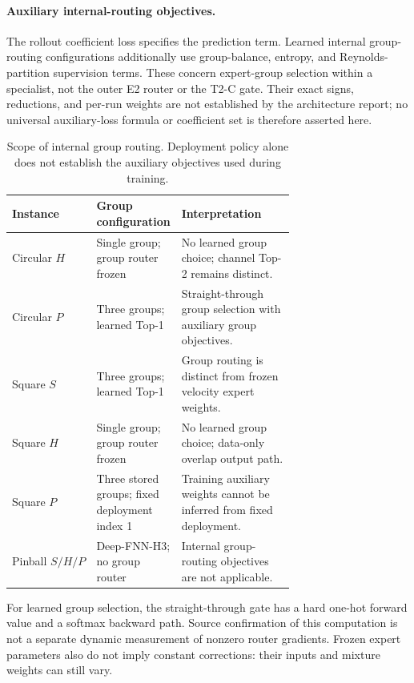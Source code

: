 \paragraph{Auxiliary internal-routing objectives.}
The rollout coefficient loss specifies the prediction term. Learned
internal group-routing configurations additionally use group-balance,
entropy, and Reynolds-partition supervision terms. These concern
expert-group selection within a specialist, not the outer E2 router
or the T2-C gate. Their exact signs, reductions, and per-run weights
are not established by the architecture report; no universal
auxiliary-loss formula or coefficient set is therefore asserted here.

\begin{table}[t]
\centering
\small
\caption{Scope of internal group routing. Deployment policy alone does
not establish the auxiliary objectives used during training.}
\label{tab:internal_objective_scope}
\begin{tabular}{@{}lp{0.30\linewidth}p{0.40\linewidth}@{}}
\toprule
Instance & Group configuration & Interpretation\\
\midrule
Circular $H$ & Single group; group router frozen & No learned group choice; channel Top-2 remains distinct.\\
Circular $P$ & Three groups; learned Top-1 & Straight-through group selection with auxiliary group objectives.\\
Square $S$ & Three groups; learned Top-1 & Group routing is distinct from frozen velocity expert weights.\\
Square $H$ & Single group; group router frozen & No learned group choice; data-only overlap output path.\\
Square $P$ & Three stored groups; fixed deployment index 1 & Training auxiliary weights cannot be inferred from fixed deployment.\\
Pinball $S/H/P$ & Deep-FNN-H3; no group router & Internal group-routing objectives are not applicable.\\
\bottomrule
\end{tabular}
\end{table}

For learned group selection, the straight-through gate has a hard
one-hot forward value and a softmax backward path. Source confirmation
of this computation is not a separate dynamic measurement of nonzero
router gradients. Frozen expert parameters also do not imply constant
corrections: their inputs and mixture weights can still vary.
